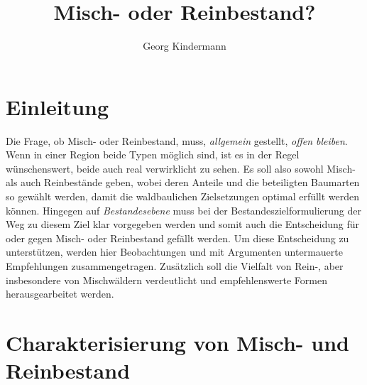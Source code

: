 \documentclass[twocolumn, paper=a4, fontsize=10pt, bibliography=totoc, index=totoc]{scrartcl}
\title{Misch- oder Reinbestand?}
\author{Georg Kindermann}
\begin{document}

\tableofcontents

\section{Einleitung}

Die Frage, ob Misch- oder Reinbestand, muss, \emph{allgemein} gestellt,
\emph{offen bleiben}. Wenn in einer Region beide Typen möglich sind, ist es in
der Regel wünschenswert, beide auch real verwirklicht zu sehen. Es soll also
sowohl Misch- als auch Reinbestände geben, wobei deren Anteile und die
beteiligten Baumarten so gewählt werden, damit die waldbaulichen Zielsetzungen
optimal erfüllt werden können. Hingegen auf \emph{Bestandesebene} muss bei der
Bestandeszielformulierung der Weg zu diesem Ziel klar vorgegeben werden und
somit auch die Entscheidung für oder gegen Misch- oder Reinbestand gefällt
werden. Um diese Entscheidung zu unterstützen, werden hier Beobachtungen und mit
Argumenten untermauerte Empfehlungen zusammengetragen. Zusätzlich soll die
Vielfalt von Rein-, aber insbesondere von Mischwäldern verdeutlicht und
empfehlenswerte Formen herausgearbeitet werden.

\section{Charakterisierung von Misch- und Reinbestand}
\label{sec:charakterisierung}
\end{document}
